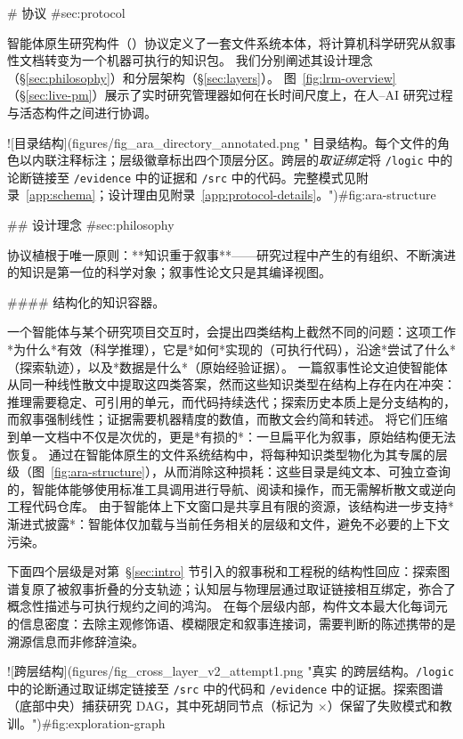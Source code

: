 \begin{markdown}
# \ara{} 协议 {#sec:protocol}

智能体原生研究构件（\ara{}）协议定义了一套文件系统本体，将计算机科学研究从叙事性文档转变为一个机器可执行的知识包。
我们分别阐述其设计理念（\S\ref{sec:philosophy}）和分层架构（\S\ref{sec:layers}）。
图~\ref{fig:lrm-overview}（\S\ref{sec:live-pm}）展示了实时研究管理器如何在长时间尺度上，在人--AI 研究过程与活态构件之间进行协调。

![目录结构](figures/fig_ara_directory_annotated.png "\ara{} 目录结构。每个文件的角色以内联注释标注；层级徽章标出四个顶层分区。跨层的\emph{取证绑定}将 \texttt{/logic} 中的论断链接至 \texttt{/evidence} 中的证据和 \texttt{/src} 中的代码。完整模式见附录~\ref{app:schema}；设计理由见附录~\ref{app:protocol-details}。"){#fig:ara-structure}

## 设计理念 {#sec:philosophy}

\ara{} 协议植根于唯一原则：**知识重于叙事**——研究过程中产生的有组织、不断演进的知识是第一位的科学对象；叙事性论文只是其编译视图。

#### 结构化的知识容器。

一个智能体与某个研究项目交互时，会提出四类结构上截然不同的问题：这项工作*为什么*有效（科学推理），它是*如何*实现的（可执行代码），沿途*尝试了什么*（探索轨迹），以及*数据是什么*（原始经验证据）。
一篇叙事性论文迫使智能体从同一种线性散文中提取这四类答案，然而这些知识类型在结构上存在内在冲突：推理需要稳定、可引用的单元，而代码持续迭代；探索历史本质上是分支结构的，而叙事强制线性；证据需要机器精度的数值，而散文会约简和转述。
将它们压缩到单一文档中不仅是次优的，更是*有损的*：一旦扁平化为叙事，原始结构便无法恢复。
\ara{} 通过在智能体原生的文件系统结构中，将每种知识类型物化为其专属的层级（图~\ref{fig:ara-structure}），从而消除这种损耗：这些目录是纯文本、可独立查询的，智能体能够使用标准工具调用进行导航、阅读和操作，而无需解析散文或逆向工程代码仓库。
由于智能体上下文窗口是共享且有限的资源，该结构进一步支持*渐进式披露*：智能体仅加载与当前任务相关的层级和文件，避免不必要的上下文污染。

下面四个层级是对第~\S\ref{sec:intro} 节引入的叙事税和工程税的结构性回应：探索图谱复原了被叙事折叠的分支轨迹；认知层与物理层通过取证链接相互绑定，弥合了概念性描述与可执行规约之间的鸿沟。
在每个层级内部，构件文本最大化每词元的信息密度：去除主观修饰语、模糊限定和叙事连接词，需要判断的陈述携带的是溯源信息而非修辞渲染。

![跨层结构](figures/fig_cross_layer_v2_attempt1.png "真实 \ara{} 的跨层结构。\texttt{/logic} 中的论断通过取证绑定链接至 \texttt{/src} 中的代码和 \texttt{/evidence} 中的证据。探索图谱（底部中央）捕获研究 DAG，其中死胡同节点（标记为 $\times$）保留了失败模式和教训。"){#fig:exploration-graph}


\end{markdown}
